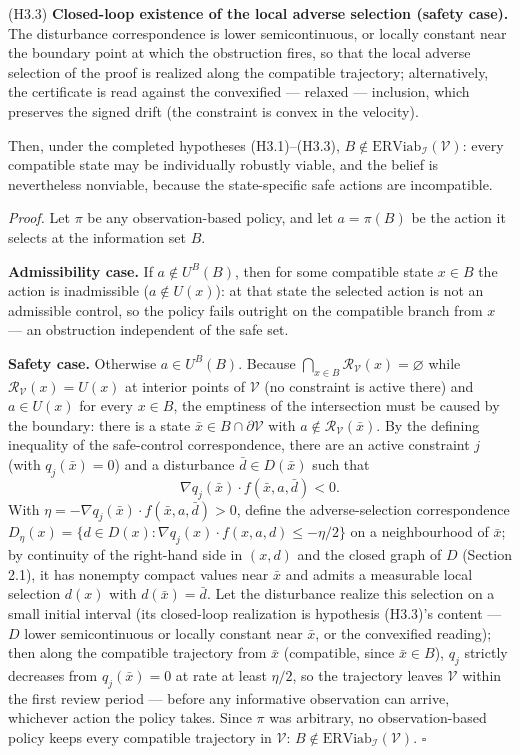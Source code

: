 \documentclass[11pt]{article}
\begin{document}
(H3.3) \textbf{Closed-loop existence of the local adverse selection
(safety case).} The disturbance correspondence is lower semicontinuous,
or locally constant near the boundary point at which the obstruction
fires, so that the local adverse selection of the proof is realized
along the compatible trajectory; alternatively, the certificate is read
against the convexified --- relaxed --- inclusion, which preserves the
signed drift (the constraint is convex in the velocity).

Then, under the completed hypotheses (H3.1)--(H3.3),
\(B \notin \mathrm{ERViab}_{\mathcal{I}}(\mathcal{V})\): every
compatible state may be individually robustly viable, and the belief is
nevertheless nonviable, because the state-specific safe actions are
incompatible.

\emph{Proof.} Let \(\pi\) be any observation-based policy, and let
\(a = \pi(B)\) be the action it selects at the information set \(B\).

\textbf{Admissibility case.} If \(a \notin U^B(B)\), then for some
compatible state \(x \in B\) the action is inadmissible
(\(a \notin U(x)\)): at that state the selected action is not an
admissible control, so the policy fails outright on the compatible
branch from \(x\) --- an obstruction independent of the safe set.

\textbf{Safety case.} Otherwise \(a \in U^B(B)\). Because
\(\bigcap_{x \in B} \mathcal{R}_{\mathcal{V}}(x) = \varnothing\) while
\(\mathcal{R}_{\mathcal{V}}(x) = U(x)\) at interior points of
\(\mathcal{V}\) (no constraint is active there) and \(a \in U(x)\) for
every \(x \in B\), the emptiness of the intersection must be caused by
the boundary: there is a state
\(\bar x \in B \cap \partial \mathcal{V}\) with
\(a \notin \mathcal{R}_{\mathcal{V}}(\bar x)\). By the defining
inequality of the safe-control correspondence, there are an active
constraint \(j\) (with \(q_j(\bar x) = 0\)) and a disturbance
\(\bar d \in D(\bar x)\) such that
\[\nabla q_j(\bar x) \cdot f(\bar x, a, \bar d) < 0.\] With
\(\eta = - \nabla q_j(\bar x) \cdot f(\bar x, a, \bar d) > 0\), define
the adverse-selection correspondence
\(D_{\eta}(x) = \{ d \in D(x) : \nabla q_j(x) \cdot f(x, a, d) \le -\eta/2 \}\)
on a neighbourhood of \(\bar x\); by continuity of the right-hand side
in \((x,d)\) and the closed graph of \(D\) (Section 2.1), it has
nonempty compact values near \(\bar x\) and admits a measurable local
selection \(d(x)\) with \(d(\bar x) = \bar d\). Let the disturbance
realize this selection on a small initial interval (its closed-loop
realization is hypothesis (H3.3)'s content --- \(D\) lower
semicontinuous or locally constant near \(\bar x\), or the convexified
reading); then along the compatible trajectory from \(\bar x\)
(compatible, since \(\bar x \in B\)), \(q_j\) strictly decreases from
\(q_j(\bar x) = 0\) at rate at least \(\eta/2\), so the trajectory
leaves \(\mathcal{V}\) within the first review period --- before any
informative observation can arrive, whichever action the policy takes.
Since \(\pi\) was arbitrary, no observation-based policy keeps every
compatible trajectory in \(\mathcal{V}\):
\(B \notin \mathrm{ERViab}_{\mathcal{I}}(\mathcal{V})\). \ensuremath{\square}
\end{document}
